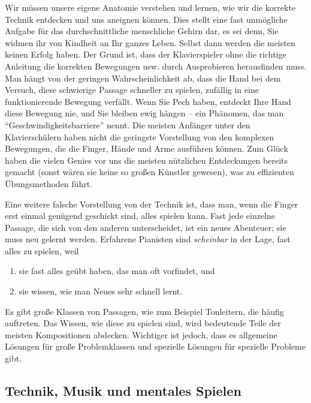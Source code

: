 Wir müssen unsere eigene Anatomie verstehen und lernen, wie wir die korrekte Technik entdecken und uns aneignen können.
Dies stellt eine fast unmögliche Aufgabe für das durchschnittliche menschliche Gehirn dar, es sei denn, Sie widmen ihr von Kindheit an Ihr ganzes Leben.
Selbst dann werden die meisten keinen Erfolg haben.
Der Grund ist, dass der Klavierspieler ohne die richtige Anleitung die korrekten Bewegungen usw. durch Ausprobieren herausfinden muss.
Man hängt von der geringen Wahrscheinlichkeit ab, dass die Hand bei dem Versuch, diese schwierige Passage schneller zu spielen, zufällig in eine funktionierende Bewegung verfällt.
Wenn Sie Pech haben, entdeckt Ihre Hand diese Bewegung nie, und Sie bleiben ewig hängen -- ein Phänomen, das man \enquote{Geschwindigkeitsbarriere} nennt.
Die meisten Anfänger unter den Klavierschülern haben nicht die geringste Vorstellung von den komplexen Bewegungen, die die Finger, Hände und Arme ausführen können.
Zum Glück haben die vielen Genies vor uns die meisten nützlichen Entdeckungen bereits gemacht (sonst wären sie keine so großen Künstler gewesen), was zu effizienten Übungsmethoden führt.

Eine weitere falsche Vorstellung von der Technik ist, dass man, wenn die Finger erst einmal genügend geschickt sind, alles spielen kann.
Fast jede einzelne Passage, die sich von den anderen unterscheidet, ist ein neues Abenteuer; sie muss neu gelernt werden.
Erfahrene Pianisten sind \textit{scheinbar} in der Lage, fast alles zu spielen, weil

\begin{enumerate}[label={\arabic*.}] 
 \item sie fast alles geübt haben, das man oft vorfindet, und
 \item sie wissen, wie man Neues sehr schnell lernt.
\end{enumerate}

Es gibt große Klassen von Passagen, wie zum Beispiel Tonleitern, die häufig auftreten.
Das Wissen, wie diese zu spielen sind, wird bedeutende Teile der meisten Kompositionen abdecken.
Wichtiger ist jedoch, dass es allgemeine Lösungen für große Problemklassen und spezielle Lösungen für spezielle Probleme gibt.


\subsection{Technik, Musik und mentales Spielen}
\label{c1i3}

